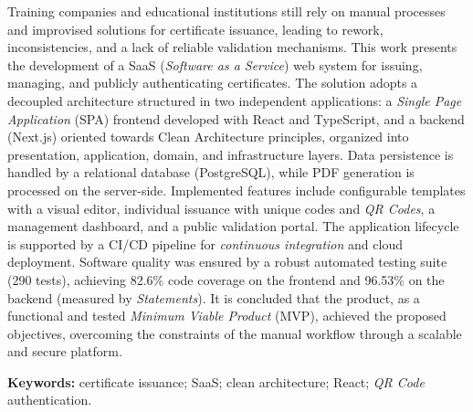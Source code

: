 Training companies and educational institutions still rely on manual processes and improvised solutions for certificate issuance, leading to rework, inconsistencies, and a lack of reliable validation mechanisms. This work presents the development of a SaaS (\textit{Software as a Service}) web system for issuing, managing, and publicly authenticating certificates. The solution adopts a decoupled architecture structured in two independent applications: a \textit{Single Page Application} (SPA) frontend developed with React and TypeScript, and a backend (Next.js) oriented towards Clean Architecture principles, organized into presentation, application, domain, and infrastructure layers. Data persistence is handled by a relational database (PostgreSQL), while PDF generation is processed on the server-side. Implemented features include configurable templates with a visual editor, individual issuance with unique codes and \textit{QR Codes}, a management dashboard, and a public validation portal. The application lifecycle is supported by a CI/CD pipeline for \textit{continuous integration} and cloud deployment. Software quality was ensured by a robust automated testing suite (290 tests), achieving 82.6\% code coverage on the frontend and 96.53\% on the backend (measured by \textit{Statements}). It is concluded that the product, as a functional and tested \textit{Minimum Viable Product} (MVP), achieved the proposed objectives, overcoming the constraints of the manual workflow through a scalable and secure platform.

\noindent\textbf{Keywords:} certificate issuance; SaaS; clean architecture; React; \textit{QR Code} authentication.
